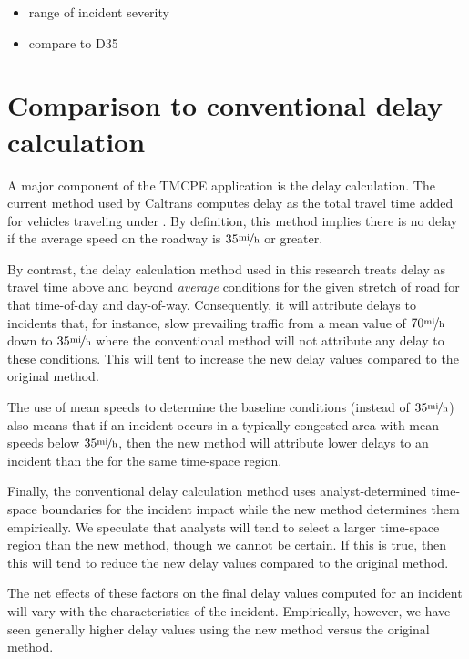 \documentclass[12pt]{report}
\newcounter{time}
\newcounter{space}
\begin{document}
\begin{itemize}
\item range of incident severity
\item compare to D35
\end{itemize}

\section{Comparison to conventional delay calculation}
\label{sec:compare-conv}

A major component of the \ac{TMCPE} application is the delay calculation.  The
current method used by Caltrans computes delay as the total travel time added
for vehicles traveling under .  By definition, this method implies there is no delay if
the average speed on the roadway is $35\unitfrac{mi}{h}$ or greater.

By contrast, the delay calculation method used in this research treats delay as
travel time above and beyond \emph{average} conditions for the given stretch of
road for that time-of-day and day-of-way.  Consequently, it will attribute
delays to incidents that, for instance, slow prevailing traffic from a mean
value of $70\unitfrac{mi}{h}$ down to $35\unitfrac{mi}{h}$ where the
conventional method will not attribute any delay to these conditions.  This will
tent to increase the new delay values compared to the original method.

The use of mean speeds to determine the baseline conditions (instead of
$35\unitfrac{mi}{h}$) also means that if an incident occurs in a typically
congested area with mean speeds below $35\unitfrac{mi}{h}$, then the new method
will attribute lower delays to an incident than the  for the same time-space region.

Finally, the conventional delay calculation method uses analyst-determined
time-space boundaries for the incident impact while the new method determines
them empirically.  We speculate that analysts will tend to select a larger
time-space region than the new method, though we cannot be certain.  If this is
true, then this will tend to reduce the new delay values compared to the
original method.

The net effects of these factors on the final delay values computed for an
incident will vary with the characteristics of the incident.  Empirically,
however, we have seen generally higher delay values using the new method versus
the original method.  
\end{document}

